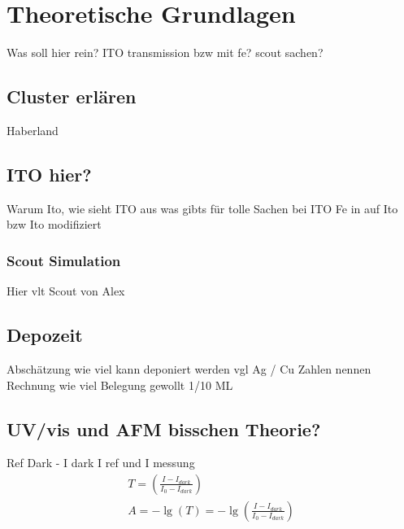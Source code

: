 \chapter{Theoretische Grundlagen}
Was soll hier rein? ITO transmission bzw mit fe? scout sachen?
\section{Cluster erlären}
Haberland
\section{ITO hier?}
Warum Ito, wie sieht ITO aus
was gibts für tolle Sachen  bei ITO
Fe in auf Ito bzw Ito modifiziert
\subsection{Scout Simulation}
\label{sec:scoutsim}
Hier vlt Scout von Alex
\section{Depozeit}
Abschätzung wie viel kann deponiert werden vgl Ag / Cu Zahlen nennen
Rechnung wie viel Belegung gewollt 1/10 ML
\section{UV/vis und AFM bisschen Theorie?}
Ref Dark - I dark I ref und I messung
\begin{align*}
    T=\left(\frac{I-I_{dark}}{I_0-I_{dark}}\right)\\
    A=- \lg\left(T\right) = -\lg\left(\frac{I-I_{dark}}{I_0-I_{dark}}\right)
\end{align*}
